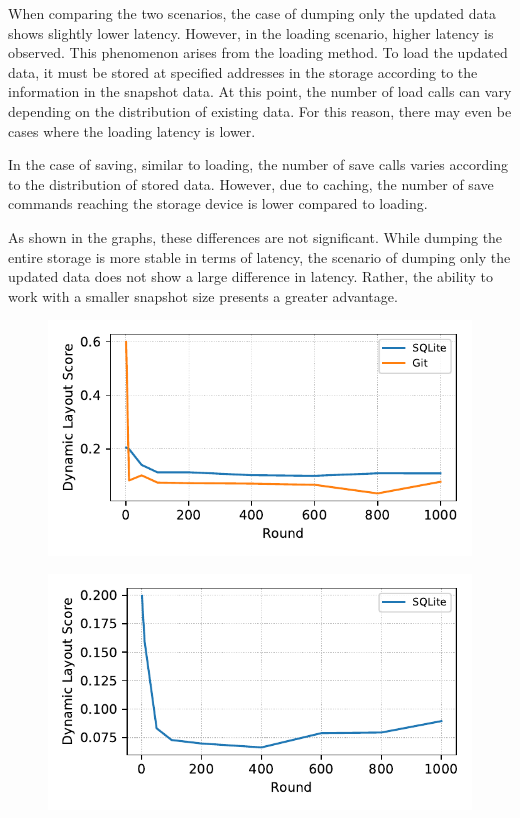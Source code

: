 When comparing the two scenarios, the case of dumping only the updated data shows slightly lower latency.
However, in the loading scenario, higher latency is observed. This phenomenon arises from the loading method.
To load the updated data, it must be stored at specified addresses in the storage according to the information in the snapshot data.
At this point, the number of load calls can vary depending on the distribution of existing data.
For this reason, there may even be cases where the loading latency is lower.

In the case of saving, similar to loading, the number of save calls varies according to the distribution of stored data.
However, due to caching, the number of save commands reaching the storage device is lower compared to loading.

As shown in the graphs, these differences are not significant.
While dumping the entire storage is more stable in terms of latency, the scenario of dumping only the updated data does not show a large difference in latency.
Rather, the ability to work with a smaller snapshot size presents a greater advantage.


\begin{figure}[t]
    \centering
    \includegraphics[width=0.95\columnwidth]{graphs/py_graph/dynamic}
    \caption{}
    \label{f:dynamic}
\end{figure}

\begin{figure}[t]
    \centering
    \includegraphics[width=0.95\columnwidth]{graphs/py_graph/dynamic-f2fs}
    \caption{}
    \label{f:f2fs_dynamic_score}
\end{figure}


